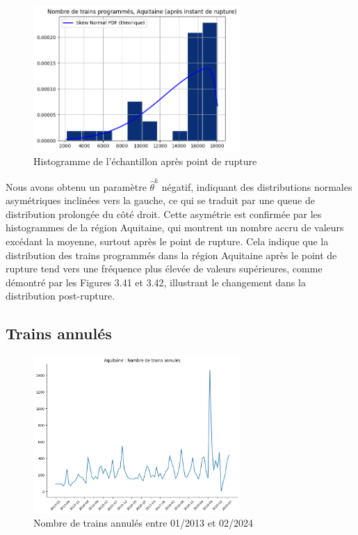 {\begin{figure}[H]
  \centering
  \includegraphics[width=0.7\textwidth]{image/AQ-FIG6.png}
  \caption{Histogramme de l'échantillon après point de rupture}
\end{figure}

Nous avons obtenu un paramètre $\hat{\theta}^k$ négatif, indiquant des distributions normales asymétriques inclinées vers la gauche, ce qui se traduit par une queue de distribution prolongée du côté droit. Cette asymétrie est confirmée par les histogrammes de la région Aquitaine, qui montrent un nombre accru de valeurs excédant la moyenne, surtout après le point de rupture. Cela indique que la distribution des trains programmés dans la région Aquitaine après le point de rupture tend vers une fréquence plus élevée de valeurs supérieures, comme démontré par les Figures 3.41 et 3.42, illustrant le changement dans la distribution post-rupture.

\subsection{Trains annulés}

\begin{figure}[H]
  \centering
  \includegraphics[width=0.7\textwidth]{image/AQ-FIG7.png}
  \caption{Nombre de trains annulés entre 01/2013 et 02/2024}
\end{figure}

}
